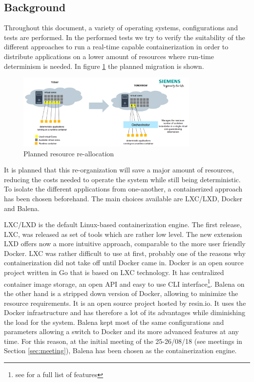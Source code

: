 \documentclass[]{scrartcl}
\begin{document}
\subsection{Background}

Throughout this document, a variety of operating systems, configurations and tests are performed.
In the performed tests we try to verify the suitability of the different approaches to run a real-time capable containerization in order to distribute applications on a lower amount of resources where run-time determinism is needed. In figure \ref{fig:plan} the planned migration is shown. 

\begin{figure}
	\centering
	\includegraphics[width=0.8\textwidth]{plan}
	\caption{Planned resource re-allocation}
	\label{fig:plan}
\end{figure}

It is planned that this re-organization will save a major amount of resources, reducing the costs needed to operate the system while still being deterministic. To isolate the different applications from one-another, a containerized approach has been chosen beforehand. The main choices available are LXC/LXD, Docker and Balena.

LXC/LXD is the default Linux-based containerization engine. The first release, LXC, was released as set of tools which are rather low level. The new extension LXD offers now a more intuitive approach, comparable to the more user friendly Docker. LXC was rather difficult to use at first, probably one of the reasons why containerization did not take off until Docker came in. Docker is an open source project written in Go that is based on LXC technology. It has centralized container image storage, an open API and easy to use CLI interface\footnote{see \cite{docker01} for a full list of features}. Balena on the other hand is a stripped down version of Docker, allowing to minimize the resource requirements. It is an open source project hosted by resin.io. It uses the Docker infrastructure and has therefore a lot of its advantages while diminishing the load for the system. Balena kept most of the same configurations and parameters allowing a switch to Docker and its more advanced features at any time. For this reason, at the initial meeting of the 25-26/08/18 (see meetings in Section \ref{sec:meeting}), Balena has been chosen as the containerization engine. 
\end{document}
